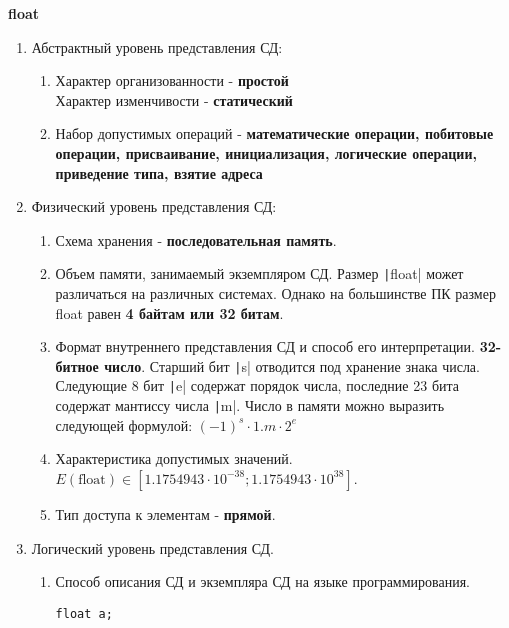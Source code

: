 \documentclass[a4paper,14pt]{extarticle}
\begin{document}
\begin{enumerate}
	      \textbf{float}
	      \begin{enumerate}[label*=\arabic*.]
		      \item Абстрактный уровень представления СД:

		            \begin{enumerate}[label*=\arabic*.]
			            \item Характер организованности - \textbf{простой}\\
			                  Характер изменчивости - \textbf{статический}
			            \item Набор допустимых операций - \textbf{математические операции, побитовые операции, присваивание, инициализация, логические операции,
				                  приведение типа, взятие адреса}
		            \end{enumerate}

		      \item Физический уровень представления СД:

		            \begin{enumerate}[label*=\arabic*.]
			            \item Схема хранения - \textbf{последовательная память}.
			            \item Объем памяти, занимаемый экземпляром СД.
			                  Размер \texttt|float| может различаться на различных системах.
			                  Однако на большинстве ПК размер float равен \textbf{4 байтам или 32 битам}.
			            \item Формат внутреннего представления СД и способ его интерпретации.
			                  \textbf{32-битное число}. Старший бит \texttt|s| отводится под хранение знака числа.
			                  Следующие 8 бит \texttt|e| содержат порядок числа, последние 23 бита содержат мантиссу числа \texttt|m|.
							  Число в памяти можно выразить следующей формулой: $(-1)^s \cdot 1.m \cdot 2^e$
			            \item Характеристика допустимых значений.\\
			                  $E(\text{float}) \in [1.1754943\cdot10^{-38}; 1.1754943\cdot10^{38}]$.
			            \item Тип доступа к элементам - \textbf{прямой}.
		            \end{enumerate}

		      \item Логический уровень представления СД.
		            \begin{enumerate}[label*=\arabic*.]
			            \item Способ описания СД и экземпляра СД на языке программирования.
			                  \begin{verbatim}
float a;
					  \end{verbatim}
		            \end{enumerate}
	      \end{enumerate}


\end{enumerate}
\end{document}

